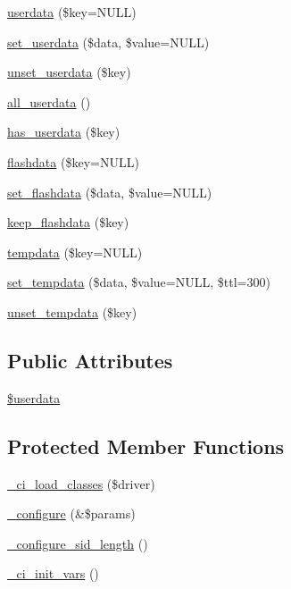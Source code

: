 \begin{DoxyCompactItemize}
\mbox{\hyperlink{class_c_i___session_a0d9b66f935a7ea2fd9dcee9d4e59f25c}{userdata}} (\$key=N\+U\+LL)
\item 
\mbox{\hyperlink{class_c_i___session_a01cf6b1d6811b2a3d9692807ad2ad155}{set\+\_\+userdata}} (\$data, \$value=N\+U\+LL)
\item 
\mbox{\hyperlink{class_c_i___session_a3a6fb33026cbe0467b6158978e198ab6}{unset\+\_\+userdata}} (\$key)
\item 
\mbox{\hyperlink{class_c_i___session_a3e095b6745bbc9a107f0809243b73245}{all\+\_\+userdata}} ()
\item 
\mbox{\hyperlink{class_c_i___session_a5d793605b7edaf121ec5857b7256f3d2}{has\+\_\+userdata}} (\$key)
\item 
\mbox{\hyperlink{class_c_i___session_a1ee691085a3041a9dd06a1b55a967185}{flashdata}} (\$key=N\+U\+LL)
\item 
\mbox{\hyperlink{class_c_i___session_a29205134d9c4cdce2f7e8104704d1ac7}{set\+\_\+flashdata}} (\$data, \$value=N\+U\+LL)
\item 
\mbox{\hyperlink{class_c_i___session_adf109663093a476b32b93e22e6b66401}{keep\+\_\+flashdata}} (\$key)
\item 
\mbox{\hyperlink{class_c_i___session_a3196d1dc2fcad340a8a307f12d3535c0}{tempdata}} (\$key=N\+U\+LL)
\item 
\mbox{\hyperlink{class_c_i___session_a0ca4fdada10d4812d2baf357b7981679}{set\+\_\+tempdata}} (\$data, \$value=N\+U\+LL, \$ttl=300)
\item 
\mbox{\hyperlink{class_c_i___session_a3d68c0075dd3d1ca3f1368ba331d9436}{unset\+\_\+tempdata}} (\$key)
\end{DoxyCompactItemize}
\subsection*{Public Attributes}
\begin{DoxyCompactItemize}
\item 
\mbox{\hyperlink{class_c_i___session_a39fc3a12ae08c0ce0c7dce1f78f3e882}{\$userdata}}
\end{DoxyCompactItemize}
\subsection*{Protected Member Functions}
\begin{DoxyCompactItemize}
\item 
\mbox{\hyperlink{class_c_i___session_aa9ca87983b668d4f3e7cc1db2d2867de}{\+\_\+ci\+\_\+load\+\_\+classes}} (\$driver)
\item 
\mbox{\hyperlink{class_c_i___session_a3739e1190b67221d74bbc34790f383fb}{\+\_\+configure}} (\&\$params)
\item 
\mbox{\hyperlink{class_c_i___session_a3552a6e7f4722e2ab20fe2923cb89e9f}{\+\_\+configure\+\_\+sid\+\_\+length}} ()
\item 
\mbox{\hyperlink{class_c_i___session_a24bd5f2a55cbf920478f1604163ed71e}{\+\_\+ci\+\_\+init\+\_\+vars}} ()
\end{DoxyCompactItemize}
